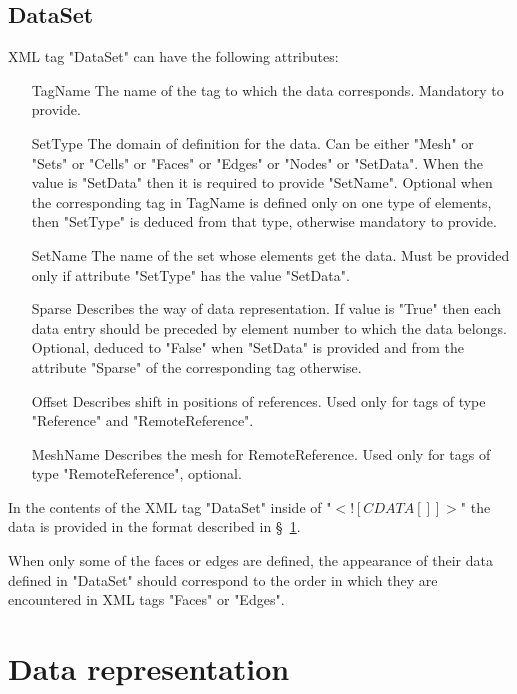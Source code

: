 \documentclass[14pt]{article}
\begin{document}
\subsection{DataSet} \label{tag_dataset}
XML tag "DataSet" can have the following attributes:
\begin{itemize}
\item[TagName] The name of the tag to which the data corresponds. Mandatory to provide.
\item[SetType] The domain of definition for the data. Can be either "Mesh" or "Sets" or "Cells" or "Faces" or "Edges" or "Nodes" or "SetData". When the value is "SetData" then it is required to provide "SetName". Optional when the corresponding tag in TagName is defined only on one type of elements, then "SetType" is deduced from that type, otherwise mandatory to provide.
\item[SetName] The name of the set whose elements get the data. Must be provided only if attribute "SetType" has the value "SetData".
\item[Sparse] Describes the way of data representation. If value is "True" then each data entry should be preceded by element number to which the data belongs. Optional, deduced to "False" when "SetData" is provided and from the attribute "Sparse" of the corresponding tag otherwise.
\item[Offset] Describes shift in positions of references. Used only for tags of type "Reference" and "RemoteReference".
\item[MeshName] Describes the mesh for RemoteReference. Used only for tags of type "RemoteReference", optional.
\end{itemize}

In the contents of the XML tag "DataSet" inside of  "$<![CDATA[]]>$" the data is provided in the format described in \S~\ref{data_format}.

When only some of the faces or edges are defined,  the appearance of their data defined in "DataSet" should correspond to the order in which they are encountered in XML tags "Faces" or "Edges". 

\section{Data representation} \label{data_format}
\end{document}
